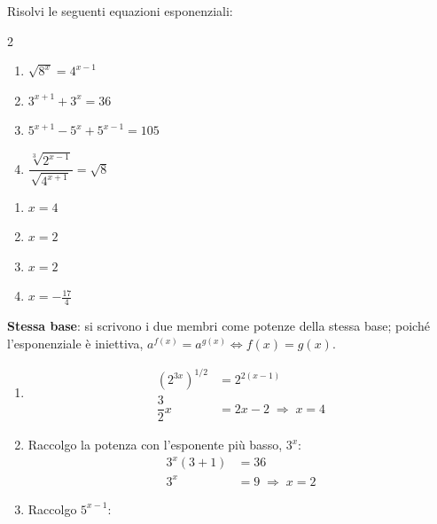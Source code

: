 
\begin{question}[ID=3.4, subtitle={Equazioni con radicali e raccoglimento}, difficulty=media, tags={equazioni, esponenziali, radicali, raccoglimento}]
Risolvi le seguenti equazioni esponenziali:
\begin{center}\begin{minipage}{0.92\linewidth}
\begin{multicols}{2}
\begin{enumerate}[leftmargin=3.2cm]
\item $\sqrt{8^{x}} = 4^{x-1}$
\item $3^{x+1} + 3^{x} = 36$
\item $5^{x+1} - 5^{x} + 5^{x-1} = 105$
\item $\dfrac{\sqrt[3]{2^{x-1}}}{\sqrt{4^{x+1}}} = \sqrt{8}$
\end{enumerate}
\end{multicols}
\end{minipage}\end{center}
\begin{solution}
\begin{enumerate}
    \item $x=4$
    \item $x=2$
    \item $x=2$
    \item $x=-\tfrac{17}{4}$
\end{enumerate}
\end{solution}
\begin{explanation}
\textbf{Stessa base}: si scrivono i due membri come potenze della stessa base; poiché l'esponenziale è iniettiva, $a^{f(x)}=a^{g(x)} \iff f(x)=g(x)$.
\begin{enumerate}
    \item \[\begin{aligned}
    (2^{3x})^{1/2} &= 2^{2(x-1)}\\
    \dfrac32x &= 2x-2 \;\Rightarrow\; x=4
    \end{aligned}\]
    \item Raccolgo la potenza con l'esponente più basso, $3^x$:
    \[\begin{aligned}
    3^x(3+1) &= 36\\
    3^x &= 9 \;\Rightarrow\; x=2
    \end{aligned}\]
    \item Raccolgo $5^{x-1}$:
    \[\begin{aligned}

\end{aligned}\]
\end{enumerate}
\end{explanation}
\end{question}
